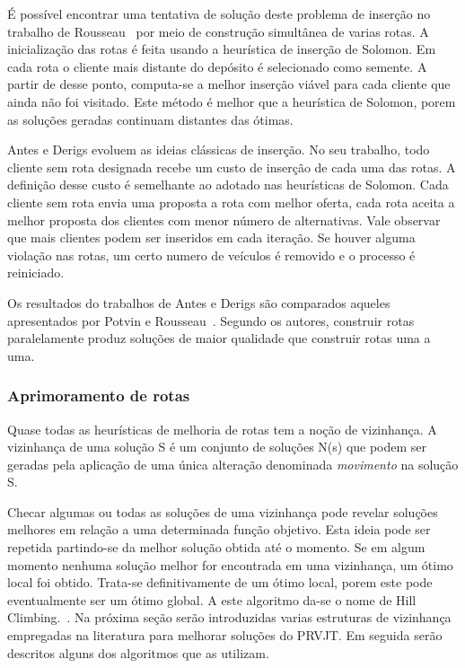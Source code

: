 É possível encontrar uma tentativa de solução deste problema de inserção no trabalho de Rousseau~\cite{Rousseau} por meio de construção simultânea de varias rotas. A inicialização das rotas é feita usando a heurística de inserção de Solomon. Em cada rota o cliente mais distante do depósito é selecionado como semente.  A partir de desse ponto, computa-se a melhor inserção viável para cada cliente que ainda não foi visitado. Este método é melhor que a heurística de Solomon, porem as soluções geradas continuam distantes das ótimas.

Antes e Derigs \cite{Derigs} evoluem as ideias clássicas de inserção. No seu trabalho, todo cliente sem rota designada recebe um custo de inserção de cada uma das rotas. A definição desse custo é semelhante ao adotado nas  heurísticas de Solomon.  Cada cliente sem rota envia uma proposta a rota com melhor oferta, cada rota aceita a melhor proposta dos clientes com menor número de alternativas.  Vale observar que mais clientes podem ser inseridos em cada iteração.  Se houver alguma violação nas rotas,  um certo numero de veículos é removido e o processo é reiniciado. 

Os resultados do trabalhos de Antes e Derigs \cite{Derigs} são comparados aqueles apresentados por Potvin e Rousseau~\cite{Rousseau}. Segundo os autores, construir rotas paralelamente produz soluções de maior qualidade que construir rotas uma a uma.


\subsubsection{Aprimoramento de rotas}

Quase todas as heurísticas de melhoria de rotas tem a noção de vizinhança. A vizinhança de uma solução S é um conjunto de soluções N(s) que podem ser geradas pela aplicação de uma única alteração denominada \textit{movimento} na solução S.

Checar algumas ou todas as soluções de uma vizinhança pode revelar soluções melhores em relação a uma determinada função objetivo. Esta ideia pode ser repetida partindo-se da melhor solução obtida até o momento. Se em algum momento nenhuma solução melhor for encontrada em uma vizinhança, um ótimo local foi obtido.  Trata-se definitivamente de um ótimo local, porem este pode eventualmente ser um ótimo global.  A este algoritmo da-se o nome de Hill Climbing.~\cite{Gendreau}.
Na próxima seção serão introduzidas varias estruturas de vizinhança empregadas na literatura para melhorar soluções do PRVJT. Em seguida serão descritos alguns dos algoritmos que as utilizam.

